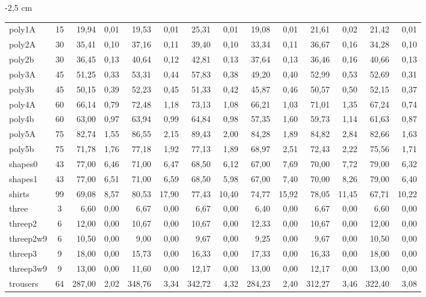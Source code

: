 \documentclass{article}
\newcommand{\lgray}{\cellcolor{lightgray}}
\begin{document}
\begin{adjustwidth}{-2 cm}{-2,5 cm}
\begin{threeparttable}[!htb]
{\begin{tabular}{|l|c|rr|rr|rr|rr|rr|rr|}
            poly1A &15  &19,94 &0,01  &19,53 &0,01  &25,31 &0,01  &19,08 &0,01  &21,61 &0,02  &21,42 &0,01 \\
            poly2A &30  &35,41 &0,10  &37,16 &0,11  &39,40 &0,10  &33,34 &0,11  &36,67 &0,16  &34,28 &0,10 \\
            poly2b &30  &36,45 &0,13  &40,64 &0,12  &42,81 &0,13  &37,64 &0,13  &36,46 &0,16  &40,66 &0,13 \\
            poly3A &45  &51,25 &0,33  &53,31 &0,44  &57,83 &0,38  &\lgray49,20 &0,40  &52,99 &0,53  &52,69 &0,31 \\
            poly3b &45  &50,15 &0,39  &52,23 &0,45  &51,33 &0,42  &45,87 &0,46  &50,57 &0,50  &52,15 &0,37 \\
            poly4A &60  &\lgray66,14 &0,79  &72,48 &1,18  &73,13 &1,08  &66,21 &1,03  &71,01 &1,35  &67,24 &0,74 \\
            poly4b &60  &63,00 &0,97  &63,94 &0,99  &64,84 &0,98  &57,35 &1,60  &59,73 &1,14  &61,63 &0,87 \\
            poly5A &75  &82,74 &1,55  &86,55 &2,15  &89,43 &2,00  &84,28 &1,89  &84,82 &2,84  &82,66 &1,63 \\
            poly5b &75  &71,78 &1,76  &77,18 &1,92  &77,13 &1,89  &68,97 &2,51  &72,43 &2,22  &75,56 &1,71 \\
            shapes0 &43  &77,00 &6,46  &71,00 &6,47  &68,50 &6,12  &67,00 &7,69  &70,00 &7,72  &79,00 &6,32 \\
            shapes1 &43  &77,00 &6,51  &71,00 &6,59  &68,50 &5,98  &67,00 &7,40  &70,00 &8,26  &79,00 &6,40 \\
            shirts &99  &69,08 &8,57  &80,53 &17,90  &77,43 &10,40  &74,77 &15,92  &78,05 &11,45  &67,71 &10,22 \\
            three &3  &6,60 &0,00  &6,67 &0,00  &6,67 &0,00  &6,40 &0,00  &6,67 &0,00  &6,60 &0,00 \\
            threep2 &6  &12,00 &0,00  &10,67 &0,00  &10,67 &0,00  &12,33 &0,00  &10,67 &0,00  &12,00 &0,00 \\
            threep2w9 &6  &10,50 &0,00  &9,00 &0,00  &9,67 &0,00  &9,25 &0,00  &9,67 &0,00  &10,50 &0,00 \\
            threep3 &9  &18,00 &0,00  &\lgray15,73 &0,00  &16,33 &0,00  &17,33 &0,00  &16,33 &0,00  &18,00 &0,00 \\
            threep3w9 &9  &13,00 &0,00  &\lgray11,60 &0,00  &12,17 &0,00  &13,00 &0,00  &12,17 &0,00  &13,00 &0,00 \\
            trousers &64  &287,00 &2,02  &348,76 &3,34  &342,72 &4,32  &284,23 &2,40  &312,27 &3,46  &322,40 &3,08 \\
            \hline
        \end{tabular}
    }
    \label{tab:t2}
\end{threeparttable}\end{adjustwidth}
\end{document}
